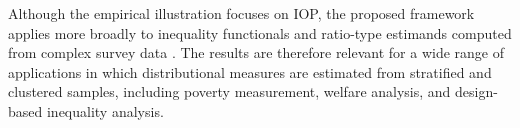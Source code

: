 \documentclass[12pt]{article}
\theoremstyle{plain}
\theoremstyle{definition}
\begin{document}
Although the empirical illustration focuses on IOP, the proposed framework applies more broadly to inequality functionals and ratio-type estimands computed from complex survey data \citep[e.g.,][]{cowell2011measuring}. The results are therefore relevant for a wide range of applications in which distributional measures are estimated from stratified and clustered samples, including poverty measurement, welfare analysis, and design-based inequality analysis.



\end{document}

